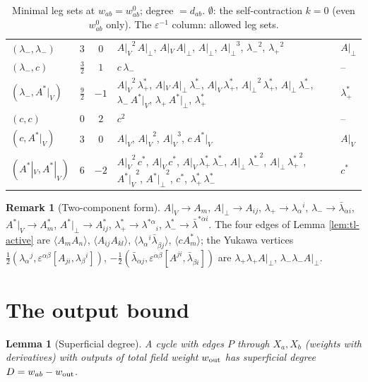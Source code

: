 \documentclass[11pt]{article}
\numberwithin{equation}{section}
\theoremstyle{plain}
\newtheorem{lemma}[theorem]{Lemma}
\theoremstyle{definition}
\newtheorem{remark}[theorem]{Remark}
\begin{document}
\begin{table}[h]
\begin{tabular}{l|c|c|l|l}
$(\lambda_-,\lambda_-)$ & $3$ & $0$ & ${A|_V}^{2}\,A|_\perp$, $A|_V\,A|_\perp$, $A|_\perp$, ${A|_\perp}^{3}$, ${\lambda_-}^{2}$, ${\lambda_+}^{2}$ & $A|_\perp$\\
$(\lambda_-,c)$ & $\tfrac{3}{2}$ & $1$ & $c\,\lambda_-$ & --\\
$(\lambda_-,A^*|_V)$ & $\tfrac{9}{2}$ & $-1$ & ${A|_V}^{2}\,\lambda^*_+$, $A|_V\,A|_\perp\,\lambda^*_-$, $A|_V\,\lambda^*_+$, ${A|_\perp}^{2}\,\lambda^*_+$, $A|_\perp\,\lambda^*_-$, $\lambda_-\,A^*|_V$, $\lambda_+\,A^*|_\perp$, $\lambda^*_+$ & $\lambda^*_+$\\
$(c,c)$ & $0$ & $2$ & ${c}^{2}$ & --\\
$(c,A^*|_V)$ & $3$ & $0$ & $A|_V$, ${A|_V}^{2}$, ${A|_V}^{3}$, $c\,A^*|_V$ & $A|_V$\\
$(A^*|_V,A^*|_V)$ & $6$ & $-2$ & ${A|_V}^{2}\,c^*$, $A|_V\,c^*$, $A|_V\,\lambda^*_+\,\lambda^*_-$, $A|_\perp\,{\lambda^*_-}^{2}$, $A|_\perp\,{\lambda^*_+}^{2}$, ${A^*|_V}^{2}$, ${A^*|_\perp}^{2}$, $c^*$, $\lambda^*_+\,\lambda^*_-$ & $c^*$\\
\end{tabular}
\caption{Minimal leg sets at $w_{ab}=w^0_{ab}$; degree $=d_{ab}$. $\emptyset$: the self-contraction $k=0$ (even $w^0_{ab}$ only). The $\varepsilon^{-1}$ column: allowed leg sets.}
\label{tab:tl-A}
\end{table}

\begin{remark}[Two-component form]
$A|_V\to A_m$, $A|_\perp\to A_{ij}$, $\lambda_+\to\lambda_\alpha{}^i$, $\lambda_-\to\bar\lambda_{\dot\alpha i}$, $A^*|_V\to A^*_m$, $A^*|_\perp\to A^*_{ij}$, $\lambda^*_+\to\lambda^{*\alpha}{}_i$, $\lambda^*_-\to\bar\lambda^{*\dot\alpha i}$. The four edges of Lemma \ref{lem:tl-active} are $\langle A_mA_n\rangle$, $\langle A_{ij}A_{kl}\rangle$, $\langle\lambda_\alpha{}^i\bar\lambda_{\dot\beta j}\rangle$, $\langle cA^*_m\rangle$; the Yukawa vertices $\tfrac12(\lambda_\alpha{}^j,\varepsilon^{\alpha\beta}[A_{ji},\lambda_\beta{}^i])$, $-\tfrac12(\bar\lambda_{\dot\alpha j},\varepsilon^{\dot\alpha\dot\beta}[A^{ji},\bar\lambda_{\dot\beta i}])$ are $\lambda_+\lambda_+A|_\perp$, $\lambda_-\lambda_-A|_\perp$.
\end{remark}


\section{The output bound}
\label{sec:tl-bound}

\begin{lemma}[Superficial degree]
\label{lem:tl-degree}
A cycle with edges $P$ through $X_a,X_b$ (weights with derivatives) with outputs of total field weight $w_{\rm out}$ has superficial degree $D=w_{ab}-w_{\rm out}$.
\end{lemma}
\end{document}
